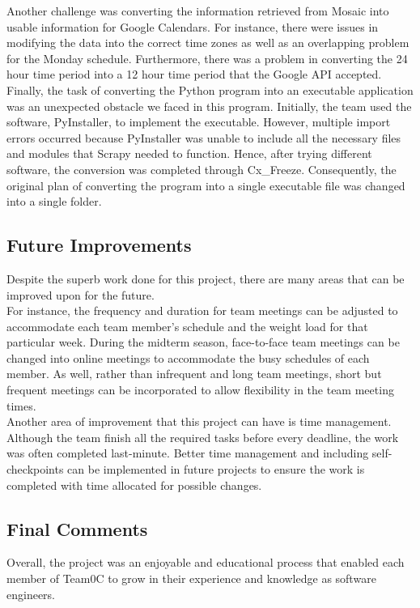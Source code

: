 \documentclass{article}
\begin{document}
Another challenge was converting the information retrieved from Mosaic into usable information for Google Calendars. For instance, there were issues in modifying the data into the correct time zones as well as an overlapping problem for the Monday schedule. Furthermore, there was a problem in converting the 24 hour time period into a 12 hour time period that the Google API accepted.\\


Finally, the task of converting the Python program into an executable application was an unexpected obstacle we faced in this program. Initially, the team used the software, PyInstaller, to implement the executable. However, multiple import errors occurred because PyInstaller was unable to include all the necessary files and modules that Scrapy needed to function. Hence, after trying different software, the conversion was completed through Cx\_Freeze. Consequently, the original plan of converting the program into a single executable file was changed into a single folder.

\subsection{Future Improvements}
\hspace{5mm} Despite the superb work done for this project, there are many areas that can be improved upon for the future. \\

For instance, the frequency and duration for team meetings can be adjusted to accommodate each team member's schedule and the weight load for that particular week. During the midterm season,  face-to-face team meetings can be changed into online meetings to accommodate the busy schedules of each member. As well, rather than infrequent and long team meetings, short but frequent meetings can be incorporated to allow flexibility in the team meeting times. \\


Another area of improvement that this project can have is time management. Although the team finish all the required tasks before every deadline, the work was often completed last-minute. Better time management and including self-checkpoints can be implemented in future projects to ensure the work is completed with time allocated for possible changes. 

\subsection{Final Comments}
\hspace{5mm}Overall, the project was an enjoyable and educational process that enabled each member of Team0C to grow in their experience and knowledge as software engineers.
\end{document}
